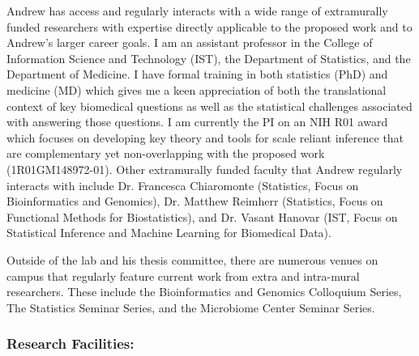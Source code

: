 \documentclass{NIHGrant}
\begin{document}
Andrew has access and regularly interacts with a wide range of extramurally
funded researchers with expertise directly applicable to the proposed work and
to Andrew's larger career goals. I am an assistant professor in the College of
Information Science and Technology (IST), the Department of Statistics, and the
Department of Medicine. I have formal training in both statistics (PhD) and
medicine (MD) which gives me a keen appreciation of both the translational
context of key biomedical questions as well as the statistical challenges
associated with answering those questions. I am currently the PI on an NIH R01
award which focuses on developing key theory and tools for scale reliant
inference that are complementary yet non-overlapping with the proposed work
(1R01GM148972-01). Other extramurally funded faculty that Andrew regularly
interacts with include Dr. Francesca Chiaromonte (Statistics, Focus on
Bioinformatics and Genomics), Dr. Matthew Reimherr (Statistics, Focus on
Functional Methods for Biostatistics), and Dr. Vasant Hanovar (IST, Focus on
Statistical Inference and Machine Learning for Biomedical Data).

Outside of the lab and his thesis committee, there are numerous venues on campus
that regularly feature current work from extra and intra-mural researchers.
These include the Bioinformatics and Genomics Colloquium Series, The Statistics
Seminar Series, and the Microbiome Center Seminar Series. 


\subsubsection*{Research Facilities: }
\end{document}
